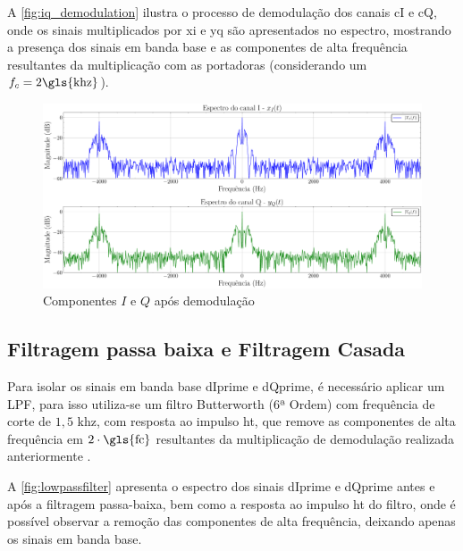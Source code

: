 A \autoref{fig:iq_demodulation} ilustra o processo de demodulação dos canais \gls{cI} e \gls{cQ}, onde os sinais multiplicados por \gls{xi} e \gls{yq} são apresentados no espectro, mostrando a presença dos sinais em banda base e as componentes de alta frequência resultantes da multiplicação com as portadoras (considerando um $f_c = 2 \text{\gls{khz}}$). \cite{cnes_services_and_message_formats_ed2_rev2_2006}

\begin{figure}[H]
	\centering
	\caption{Componentes $I$ e $Q$ após demodulação}\label{fig:iq_demodulation}
	\includegraphics[width=\linewidth]{assets/cap2/iq_demodulation.pdf}
\end{figure}


\subsection{Filtragem passa baixa e Filtragem Casada}

Para isolar os sinais em banda base \gls{dIprime} e \gls{dQprime}, é necessário aplicar um \gls{LPF}, para isso utiliza-se um filtro Butterworth (6ª Ordem) com frequência de corte de $1,5$ \gls{khz}, com resposta ao impulso \gls{ht}, que remove as componentes de alta frequência em $2 \cdot \text{\gls{fc}}$ resultantes da multiplicação de demodulação realizada anteriormente \cite{rodrigues_demodulador_2018}.

A \autoref{fig:lowpassfilter} apresenta o espectro dos sinais \gls{dIprime} e \gls{dQprime} antes e após a filtragem passa-baixa, bem como a resposta ao impulso \gls{ht} do filtro, onde é possível observar a remoção das componentes de alta frequência, deixando apenas os sinais em banda base.

